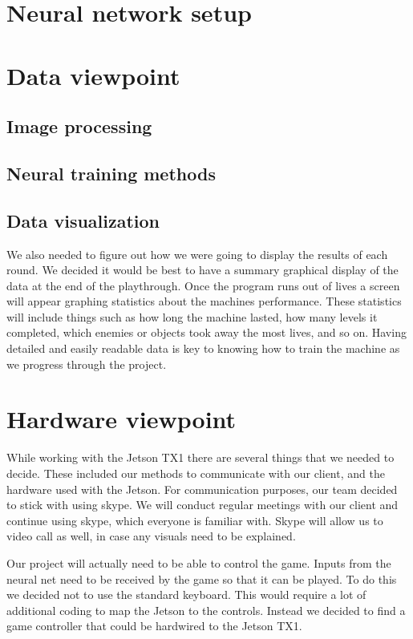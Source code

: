 \documentclass{scrreprt}
\begin{document}
\section{Neural network setup}%

\section{Data viewpoint}%

\subsection{Image processing}%

\subsection{Neural training methods}%

\subsection{Data visualization}%

We also needed to figure out how we were going to display the results of each round.
We decided it would be best to have a summary graphical display of the data at the end of the playthrough.
Once the program runs out of lives a screen will appear graphing statistics about the machines performance.
These statistics will include things such as how long the machine lasted, how many levels it completed, which enemies or objects took away the most lives, and so on.
Having detailed and easily readable data is key to knowing how to train the machine as we progress through the project.

\section{Hardware viewpoint}%

While working with the Jetson TX1 there are several things that we needed to decide.
These included our methods to communicate with our client, and the hardware used with the Jetson.
For communication purposes, our team decided to stick with using skype.
We will conduct regular meetings with our client and continue using skype, which everyone is familiar with.
Skype will allow us to video call as well, in case any visuals need to be explained.

Our project will actually need to be able to control the game.
Inputs from the neural net need to be received by the game so that it can be played.
To do this we decided not to use the standard keyboard.
This would require a lot of additional coding to map the Jetson to the controls.
Instead we decided to find a game controller that could be hardwired to the Jetson TX1.
\end{document}
